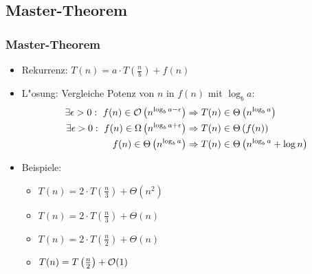 \subsection{Master-Theorem}
\begin{frame}
  \frametitle{Master-Theorem}
  \begin{itemize}
  \item Rekurrenz: $T(n) = a\cdot T\left(\frac{n}{b}\right) + f(n)$
  \item L"osung: Vergleiche Potenz von $n$ in $f(n)$ mit $\log_b a$:
    \begin{align*}
      \exists\epsilon > 0: \ f(n) \in \mathcal{O}\left(n^{\log_b a - \epsilon}\right) &\Rightarrow
             T(n) \in \Theta\left(n^{\log_ba}\right) \\
      \exists\epsilon > 0: \ f(n) \in \Omega\left(n^{\log_b a + \epsilon}\right) &\Rightarrow
             T(n) \in \Theta\left(f(n)\right) \\
      f(n) \in \Theta\left(n^{\log_b a}\right) &\Rightarrow
             T(n) \in \Theta\left(n^{\log_b a} + \log n\right)
    \end{align*}
  \item Beispiele:
    \begin{itemize} \itemsep 1em
    \item $T(n) = 2\cdot T\left(\frac{n}{3}\right) + \Theta(n^2)$
    \item $T(n) = 2\cdot T\left(\frac{n}{3}\right) + \Theta(n)$
    \item $T(n) = 2\cdot T\left(\frac{n}{2}\right) + \Theta(n)$
    \item $T(n) = T\left(\frac{n}{2}\right) + \mathcal{O}(1)$
    \end{itemize}
  \end{itemize}
\end{frame}


